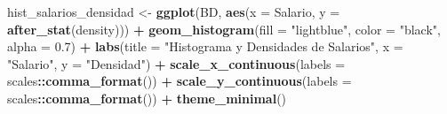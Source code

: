 \documentclass[
]{article}
\newenvironment{Shaded}{\begin{snugshade}}{\end{snugshade}}
\newcommand{\AttributeTok}[1]{\textcolor[rgb]{0.13,0.29,0.53}{#1}}
\newcommand{\FloatTok}[1]{\textcolor[rgb]{0.00,0.00,0.81}{#1}}
\newcommand{\FunctionTok}[1]{\textcolor[rgb]{0.13,0.29,0.53}{\textbf{#1}}}
\newcommand{\NormalTok}[1]{#1}
\newcommand{\OtherTok}[1]{\textcolor[rgb]{0.56,0.35,0.01}{#1}}
\newcommand{\SpecialCharTok}[1]{\textcolor[rgb]{0.81,0.36,0.00}{\textbf{#1}}}
\newcommand{\StringTok}[1]{\textcolor[rgb]{0.31,0.60,0.02}{#1}}
\begin{document}
\begin{Shaded}
\begin{Highlighting}[]
\NormalTok{hist\_salarios\_densidad }\OtherTok{\textless{}{-}} \FunctionTok{ggplot}\NormalTok{(BD, }\FunctionTok{aes}\NormalTok{(}\AttributeTok{x =}\NormalTok{ Salario, }\AttributeTok{y =} \FunctionTok{after\_stat}\NormalTok{(density))) }\SpecialCharTok{+}
  \FunctionTok{geom\_histogram}\NormalTok{(}\AttributeTok{fill =} \StringTok{"lightblue"}\NormalTok{, }\AttributeTok{color =} \StringTok{"black"}\NormalTok{, }\AttributeTok{alpha =} \FloatTok{0.7}\NormalTok{) }\SpecialCharTok{+}
  \FunctionTok{labs}\NormalTok{(}\AttributeTok{title =} \StringTok{"Histograma y Densidades de Salarios"}\NormalTok{, }\AttributeTok{x =} \StringTok{"Salario"}\NormalTok{, }\AttributeTok{y =} \StringTok{"Densidad"}\NormalTok{) }\SpecialCharTok{+} 
  \FunctionTok{scale\_x\_continuous}\NormalTok{(}\AttributeTok{labels =}\NormalTok{ scales}\SpecialCharTok{::}\FunctionTok{comma\_format}\NormalTok{()) }\SpecialCharTok{+}
  \FunctionTok{scale\_y\_continuous}\NormalTok{(}\AttributeTok{labels =}\NormalTok{ scales}\SpecialCharTok{::}\FunctionTok{comma\_format}\NormalTok{()) }\SpecialCharTok{+}
  \FunctionTok{theme\_minimal}\NormalTok{()}


\end{Highlighting}
\end{Shaded}
\end{document}
